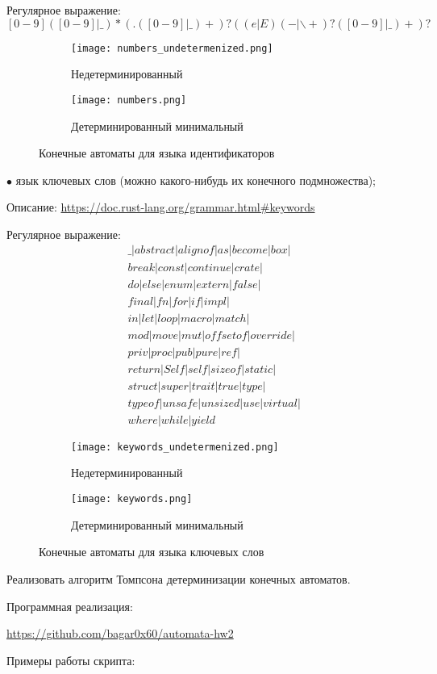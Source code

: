 Регулярное выражение: $[0-9]([0-9]|\_)*(.([0-9]|\_)+)?((e|E)(-|\backslash+)?([0-9]|\_)+)?$

\begin{figure}[h]
    \centering
    \begin{subfigure}[b]{0.8\linewidth}
      \texttt{[image: numbers\_undetermenized.png]}
      \caption{Недетерминированный}
    \end{subfigure}
    \begin{subfigure}[b]{0.8\linewidth}
      \texttt{[image: numbers.png]}
      \caption{Детерминированный минимальный}
    \end{subfigure}
    \caption{Конечные автоматы для языка идентификаторов}
\end{figure}

\break

$\bullet$ язык ключевых слов (можно какого-нибудь их конечного подмножества);

Описание: \url{https://doc.rust-lang.org/grammar.html#keywords}

Регулярное выражение: 
\begin{align*}
    &\_|abstract|alignof|as|become|box|\\
    &break|const|continue|crate|\\
    &do|else|enum|extern|false|\\
    &final|fn|for|if|impl|\\
    &in|let|loop|macro|match|\\
    &mod|move|mut|offsetof|override|\\
    &priv|proc|pub|pure|ref|\\
    &return|Self|self|sizeof|static|\\
    &struct|super|trait|true|type|\\
    &typeof|unsafe|unsized|use|virtual|\\
    &where|while|yield 
\end{align*}

\begin{figure}[h]
    \centering
    \begin{subfigure}[b]{0.4\linewidth}
      \texttt{[image: keywords\_undetermenized.png]}
      \caption{Недетерминированный}
    \end{subfigure}
    \begin{subfigure}[b]{0.4\linewidth}
      \texttt{[image: keywords.png]}
      \caption{Детерминированный минимальный}
    \end{subfigure}
    \caption{Конечные автоматы для языка ключевых слов}
\end{figure}

\break

\begin{problem}
    Реализовать алгоритм Томпсона детерминизации конечных автоматов.
\end{problem}

Программная реализация:

\url{https://github.com/bagar0x60/automata-hw2}
\break

Примеры работы скрипта: